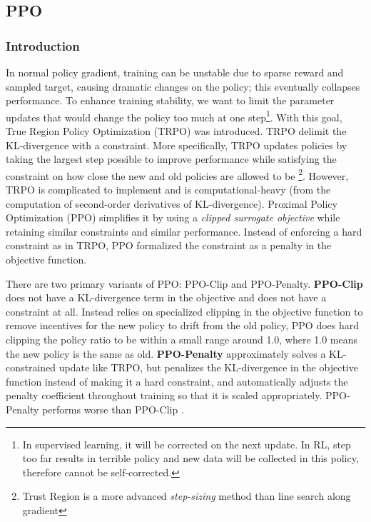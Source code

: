 \documentclass[lang=en,mode=normal,device=normal,color=blue,12pt]{elegantnote}
\DeclareMathOperator*{\1}{\mathbbm{1}}
\begin{document}
\subsection{PPO}

\subsubsection{Introduction}

In normal policy gradient, training can be unstable due to sparse reward and sampled target, causing dramatic changes on the policy; this eventually collapses performance.
To enhance training stability, we want to limit the parameter updates that would change the policy too much at one step\footnote{In supervised learning, it will be corrected on the next update. In RL, step too far results in terrible policy and new data will be collected in this policy, therefore cannot be self-corrected.}.
With this goal, True Region Policy Optimization (TRPO) \cite{schulman2017trust} was introduced.
TRPO delimit the KL-divergence with a constraint. More specifically, TRPO updates policies by taking the largest step possible to improve performance while satisfying the constraint on how close the new and old policies are allowed to be \footnote{Trust Region is a more advanced \textit{step-sizing} method than line search along gradient}.
However, TRPO is complicated to implement and is computational-heavy (from the computation of second-order derivatives of KL-divergence). Proximal Policy Optimization (PPO) \cite{schulman2017proximal} simplifies it by using a \textit{clipped surrogate objective} while retaining similar constraints and similar performance.
Instead of enforcing a hard constraint as in TRPO, PPO formalized the constraint as a penalty in the objective function.

There are two primary variants of PPO: PPO-Clip and PPO-Penalty.
\newline
\textbf{PPO-Clip} does not have a KL-divergence term in the objective and does not have a constraint at all. Instead relies on specialized clipping in the objective function to remove incentives for the new policy to drift from the old policy, PPO does hard clipping the policy ratio to be within a small range around 1.0, where 1.0 means the new policy is the same as old.
\newline
\textbf{PPO-Penalty} approximately solves a KL-constrained update like TRPO, but penalizes the KL-divergence in the objective function instead of making it a hard constraint, and automatically adjusts the penalty coefficient throughout training so that it is scaled appropriately.
PPO-Penalty performs worse than PPO-Clip \cite{schulman2017proximal}.
\end{document}
